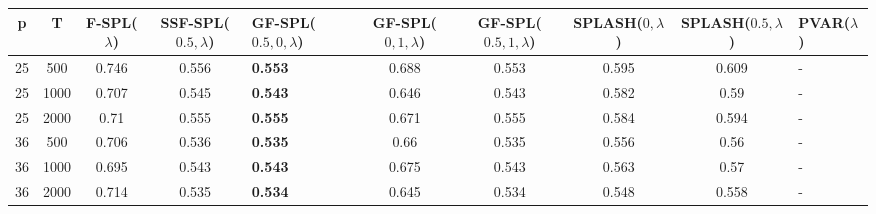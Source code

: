 \begin{tabular}{cccclccccl}
\hline
  p  &  T   &  F-SPL($\lambda$)  &  SSF-SPL($0.5, \lambda$)  & GF-SPL($0.5, 0, \lambda$)   &  GF-SPL($0, 1, \lambda$)  &  GF-SPL($0.5, 1, \lambda$)  &  SPLASH($0, \lambda$)  &  SPLASH($0.5, \lambda$)  & PVAR($\lambda$)   \\
\hline
 25  & 500  &       0.746        &           0.556           & \textbf{0.553}              &           0.688           &            0.553            &         0.595          &          0.609           & -                 \\
 25  & 1000 &       0.707        &           0.545           & \textbf{0.543}              &           0.646           &            0.543            &         0.582          &           0.59           & -                 \\
 25  & 2000 &        0.71        &           0.555           & \textbf{0.555}              &           0.671           &            0.555            &         0.584          &          0.594           & -                 \\
 36  & 500  &       0.706        &           0.536           & \textbf{0.535}              &           0.66            &            0.535            &         0.556          &           0.56           & -                 \\
 36  & 1000 &       0.695        &           0.543           & \textbf{0.543}              &           0.675           &            0.543            &         0.563          &           0.57           & -                 \\
 36  & 2000 &       0.714        &           0.535           & \textbf{0.534}              &           0.645           &            0.534            &         0.548          &          0.558           & -                 \\
\hline
\end{tabular}